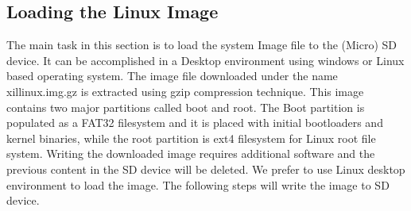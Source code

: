 \subsection{Loading the Linux Image}
The main task in this section is to load the system Image file to the (Micro) SD device. It can be accomplished in a Desktop environment using windows or Linux based operating system. The image file downloaded under the name xillinux.img.gz is extracted using gzip compression technique. This image contains two major partitions called boot and root. The Boot partition is populated as a FAT32 filesystem and it is placed with initial bootloaders and kernel binaries, while the root partition is ext4 filesystem for Linux root file system. Writing the downloaded image requires additional software and the previous content in the SD device will be deleted. We prefer to use Linux desktop environment to load the image. The following steps will write the image to SD device.
